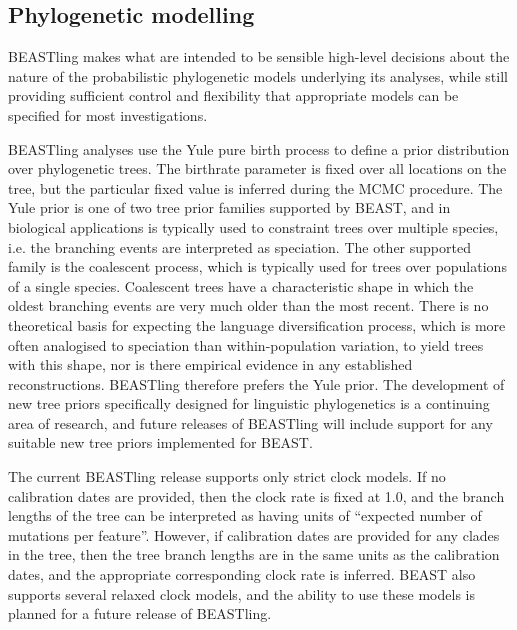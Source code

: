 \documentclass[twocolumn,10pt]{scrartcl}
\begin{document}
\subsection{Phylogenetic modelling}

BEASTling makes what are intended to be sensible high-level decisions about the nature of the probabilistic phylogenetic models underlying its analyses, while still providing sufficient control and flexibility that appropriate models can be specified for most investigations.

BEASTling analyses use the Yule pure birth process to define a prior distribution over phylogenetic trees.  The birthrate parameter is fixed over all locations on the tree, but the particular fixed value is inferred during the MCMC procedure.  The Yule prior is one of two tree prior families supported by BEAST, and in biological applications is typically used to constraint trees over multiple species, i.e. the branching events are interpreted as speciation.  The other supported family is the coalescent process, which is typically used for trees over populations of a single species.  Coalescent trees have a characteristic shape in which the oldest branching events are very much older than the most recent.  There is no theoretical basis for expecting the language diversification process, which is more often analogised to speciation than within-population variation, to yield trees with this shape, nor is there empirical evidence in any established reconstructions.  BEASTling therefore prefers the Yule prior.  The development of new tree priors specifically designed for linguistic phylogenetics is a continuing area of research, and future releases of BEASTling will include support for any suitable new tree priors implemented for BEAST.

The current BEASTling release supports only strict clock models.  If no calibration dates are provided, then the clock rate is fixed at 1.0, and the branch lengths of the tree can be interpreted as having units of ``expected number of mutations per feature''.  However, if calibration dates are provided for any clades in the tree, then the tree branch lengths are in the same units as the calibration dates, and the appropriate corresponding clock rate is inferred.  BEAST also supports several relaxed clock models\cite{Drummond2006}, and the ability to use these models is planned for a future release of BEASTling.
\end{document}
